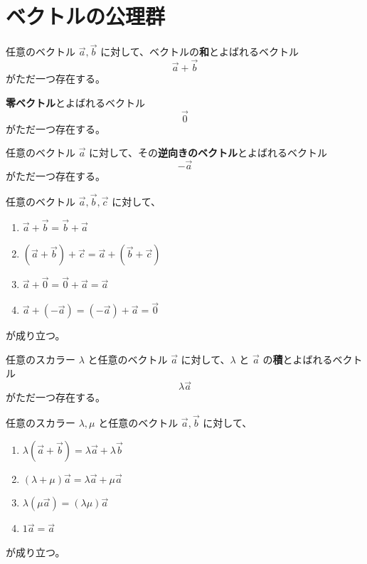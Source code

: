 \section{ベクトルの公理群}

\begin{axm}
  任意のベクトル \(\vec{a},\vec{b}\) に対して、ベクトルの\textbf{和}とよばれるベクトル
  \[\vec{a}+\vec{b}\]
  がただ一つ存在する。
\end{axm}

\begin{axm}
  \textbf{零ベクトル}とよばれるベクトル
  \[\vec{0}\]
  がただ一つ存在する。
\end{axm}

\begin{axm}
  任意のベクトル \(\vec{a}\) に対して、その\textbf{逆向きのベクトル}とよばれるベクトル
  \[-\vec{a}\]
  がただ一つ存在する。
\end{axm}

\begin{axm}
  任意のベクトル \(\vec{a},\vec{b},\vec{c}\) に対して、
  \begin{enumerate}
    \item \(\vec{a}+\vec{b}=\vec{b}+\vec{a}\)
    \item \((\vec{a}+\vec{b})+\vec{c}=\vec{a}+(\vec{b}+\vec{c})\)
    \item \(\vec{a}+\vec{0}=\vec{0}+\vec{a}=\vec{a}\)
    \item \(\vec{a}+(-\vec{a})=(-\vec{a})+\vec{a}=\vec{0}\)
  \end{enumerate}
  が成り立つ。
\end{axm}

\begin{axm}\label{251101133701}
  任意のスカラー \(\lambda\) と任意のベクトル \(\vec{a}\) に対して、\(\lambda\) と \(\vec{a}\) の\textbf{積}とよばれるベクトル
  \[\lambda\vec{a}\]
  がただ一つ存在する。
\end{axm}

\begin{axm}
  任意のスカラー \(\lambda,\mu\) と任意のベクトル \(\vec{a},\vec{b}\) に対して、
  \begin{enumerate}
    \item \(\lambda(\vec{a}+\vec{b})=\lambda\vec{a}+\lambda\vec{b}\)
    \item \((\lambda+\mu)\vec{a}=\lambda\vec{a}+\mu\vec{a}\)
    \item \(\lambda(\mu\vec{a})=(\lambda\mu)\vec{a}\)
    \item \(1\vec{a}=\vec{a}\)
  \end{enumerate}
  が成り立つ。
\end{axm}

